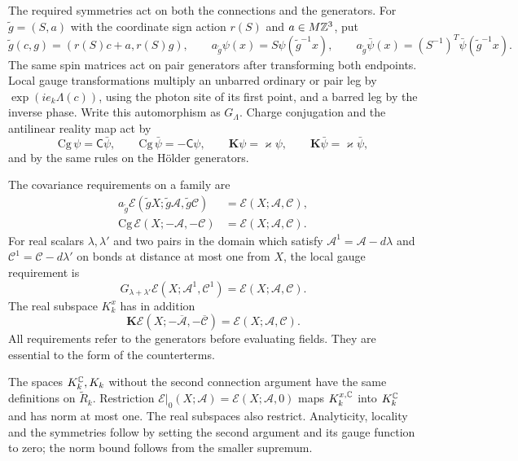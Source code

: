 The required symmetries act on both the connections and the
generators. For $\tilde g=(S,a)$ with the coordinate sign action
$r(S)$ and $a\in M\mathbb Z^3$, put
\[
 \tilde g(c,g)=(r(S)c+a,r(S)g),\qquad
 a_{\tilde g}\psi(x)=S\psi(\tilde g^{-1}x),\qquad
 a_{\tilde g}\bar\psi(x)=(S^{-1})^T\bar\psi(\tilde g^{-1}x).
\]
The same spin matrices act on pair generators after transforming
both endpoints. Local gauge transformations multiply an unbarred
ordinary or pair leg by $\exp(ie_k\Lambda(c))$, using the photon
site of its first point, and a barred leg by the inverse phase.
Write this automorphism as $G_\Lambda$.
Charge conjugation and the antilinear reality map act by
\[
 \mathrm{Cg}\,\psi=\mathsf C\bar\psi,\qquad
 \mathrm{Cg}\,\bar\psi=-\mathsf C\psi,\qquad
 \mathbf K\psi=\varkappa\psi,\qquad
 \mathbf K\bar\psi=\varkappa\bar\psi,
\]
and by the same rules on the H\"older generators.

The covariance requirements on a family are
\begin{equation}\label{eq:rg-activity-symmetries}
 \begin{split}
 a_{\tilde g}\mathscr E(\tilde gX;\tilde g\mathscr A,
                                      \tilde g\mathscr C)
                                  &=\mathscr E(X;\mathscr A,\mathscr C),\\
 \mathrm{Cg}\,\mathscr E(X;-\mathscr A,-\mathscr C)
                                  &=\mathscr E(X;\mathscr A,\mathscr C).
 \end{split}
\end{equation}
For real scalars $\lambda,\lambda'$ and two pairs in the domain
which satisfy $\mathscr A^1=\mathscr A-d\lambda$ and
$\mathscr C^1=\mathscr C-d\lambda'$ on bonds at distance at
most one from $X$, the local gauge requirement is
\[
 G_{\lambda+\lambda'}\mathscr E(X;\mathscr A^1,\mathscr C^1)
                               =\mathscr E(X;\mathscr A,\mathscr C).
\]
The real subspace $K_k^x$ has in addition
\[
 \mathbf K\mathscr E(X;-\overline{\mathscr A},-\overline{\mathscr C})
                               =\mathscr E(X;\mathscr A,\mathscr C).
\]
All requirements refer to the generators before evaluating fields.
They are essential to the form of the counterterms.

The spaces $K_k^\mathbb C,K_k$ without the second connection argument
have the same definitions on $\widetilde R_k$. Restriction
$\mathscr E|_0(X;\mathscr A)=\mathscr E(X;\mathscr A,0)$ maps
$K_k^{x,\mathbb C}$ into $K_k^\mathbb C$ and has norm at most one. The real
subspaces also restrict. Analyticity, locality and the symmetries
follow by setting the second argument and its gauge function to
zero; the norm bound follows from the smaller supremum.

